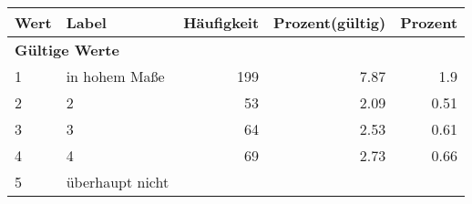      \begin{longtable}{lXrrr}
     \toprule
     \textbf{Wert} & \textbf{Label} & \textbf{Häufigkeit} & \textbf{Prozent(gültig)} & \textbf{Prozent} \\
     \endhead
     \midrule
     \multicolumn{5}{l}{\textbf{Gültige Werte}}\\

     1 &
     \multicolumn{1}{X}{ in hohem Maße   } &


       \num{199} &
       \num[round-mode=places,round-precision=2]{7,87} &
         \num[round-mode=places,round-precision=2]{1,9} \\

     2 &
     \multicolumn{1}{X}{ 2   } &


       \num{53} &
       \num[round-mode=places,round-precision=2]{2,09} &
         \num[round-mode=places,round-precision=2]{0,51} \\

     3 &
     \multicolumn{1}{X}{ 3   } &


       \num{64} &
       \num[round-mode=places,round-precision=2]{2,53} &
         \num[round-mode=places,round-precision=2]{0,61} \\

     4 &
     \multicolumn{1}{X}{ 4   } &


       \num{69} &
       \num[round-mode=places,round-precision=2]{2,73} &
         \num[round-mode=places,round-precision=2]{0,66} \\

     5 &
     \multicolumn{1}{X}{ überhaupt nicht   } &



\end{longtable}
